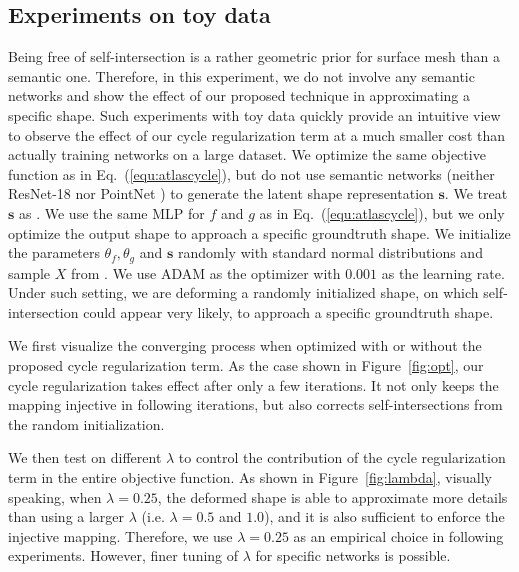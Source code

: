 \subsection{Experiments on toy data}
\label{subsec:deform}
 Being free of self-intersection is a rather geometric prior for surface mesh than a semantic one. Therefore, in this experiment, we do not involve any semantic networks and show the effect of our proposed technique in approximating a specific shape. Such experiments with toy data quickly provide an intuitive view to observe the effect of our cycle regularization term at a much smaller cost than actually training networks on a large dataset. We optimize the same objective function as in Eq.~(\ref{equ:atlascycle}), but do not use semantic networks (neither ResNet-18 \cite{resnet} nor PointNet \cite{pointnet}) to generate the latent shape representation $\mathbf{s}$. We treat $\mathbf{s}$ as . We use the same MLP for $f$ and $g$ as in Eq.~(\ref{equ:atlascycle}), but we only optimize the output shape to approach a specific groundtruth shape. We initialize the parameters $\theta_f,\theta_g$ and $\mathbf{s}$ randomly with standard normal distributions and sample $X$ from . We use ADAM \cite{adam} as the optimizer with $0.001$ as the learning rate.  Under such setting, we are deforming a randomly initialized shape, on which self-intersection could appear very likely, to approach a specific groundtruth shape. 
 
 We first visualize the converging process when optimized with or without the proposed cycle regularization term. As the case shown in Figure~\ref{fig:opt}, our cycle regularization takes effect after only a few iterations. It not only keeps the mapping injective in following iterations, but also corrects self-intersections from the random initialization.
 
We then test on different $\lambda$ to control the contribution of the cycle regularization term in the entire objective function. As shown in Figure~\ref{fig:lambda}, visually speaking, when $\lambda=0.25$, the deformed shape is able to approximate more details than using a larger $\lambda$ (i.e. $\lambda=0.5$ and $1.0$), and it is also sufficient to enforce the injective mapping.  Therefore, we use $\lambda=0.25$ as an empirical choice in following experiments. However, finer tuning of $\lambda$ for specific networks is possible.


